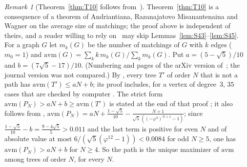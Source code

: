 \documentclass[11pt]{amsart}
\theoremstyle{definition}
\theoremstyle{remark}
\newtheorem{remark}[theorem]{Remark}
\begin{document}
\begin{remark}[Theorem~\ref{thm:T10} follows from~\cite{AMW}]\label{rem:AMW}
Theorem~\ref{thm:T10} is a consequence of a theorem of Andriantiana,
Razanajatovo Misanantenaina and Wagner on the average size of matchings; the
proof above is independent of theirs, and a reader willing to rely
on~\cite{AMW} may skip Lemmas~\ref{lem:S43}--\ref{lem:S45}. For a graph $G$
let $m_k(G)$ be the number of matchings of $G$ with $k$ edges ($m_0=1$) and
$\mathrm{avm}(G)=\sum_kk\,m_k(G)/\sum_km_k(G)$. Put $a=(5-\sqrt5)/10$ and
$b=(7\sqrt5-17)/10$. (Numbering and pages of the arXiv version of~\cite{AMW};
the journal version was not compared.) By \cite[Theorem~4.4]{AMW}, every
tree $T'$ of order $N$ that is not a path has $\mathrm{avm}(T')\le aN+b$; its
proof includes, for a vertex of degree~$3$, $35$ cases that are checked by
computer \cite[pp.~13--15]{AMW}. The strict form
$\mathrm{avm}(P_N)>aN+b\ge\mathrm{avm}(T')$ is stated at the end of that
proof \cite[p.~16]{AMW}; it also follows from \cite[Lemma~4.2,
eq.~(8)]{AMW},
$\mathrm{avm}(P_N)=aN+\frac{1-\sqrt5}{10}-\frac{N+1}{\sqrt5\,((-\varphi^2)^{N+1}-1)}$;
since $\frac{1-\sqrt5}{10}-b=\frac{9-4\sqrt5}5>0.011$ and the last term is
positive for even $N$ and of absolute value at most
$6/(\sqrt5(\varphi^{12}-1))<0.0084$ for odd $N\ge5$, one has
$\mathrm{avm}(P_N)>aN+b$ for $N\ge4$. So the path is the unique maximizer of
$\mathrm{avm}$ among trees of order $N$, for every $N$.


\end{remark}
\end{document}
